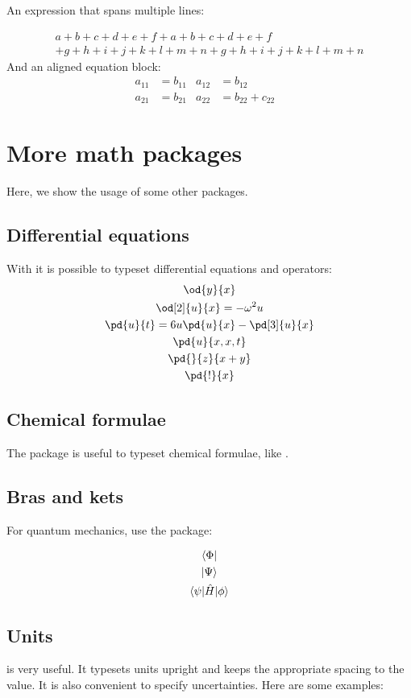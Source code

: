 An expression that spans multiple lines:

\begin{multline}
	a + b + c +d + e + f + a + b + c +d + e + f \\
	+ g + h + i + j + k + l + m + n+ g + h + i + j + k + l + m + n
\end{multline}
And an aligned equation block:
\begin{align}
	a_{11} & = b_{11}          &
	a_{12} & = b_{12}          & \\
	a_{21} & = b_{21}          &
	a_{22} & = b_{22} + c_{22}
\end{align}

\section{More math packages}
Here, we show the usage of some other packages.
\subsection{Differential equations}
With  it is possible to typeset differential equations and operators:
\begin{gather}
	\od{y}{x}\\
	\od[2]{u}{x} = -\omega^2 u\\
	\pd{u}{t} = 6u \pd{u}{x} - \pd[3]{u}{x}\\
	\pd{u}{x,x,t}\\
	\pd{}{z}{x+y}\\
	\pd{!}{x}
\end{gather}

\subsection{Chemical formulae}
The package  is useful to typeset chemical formulae, like .

\subsection{Bras and kets}
For quantum mechanics, use the  package:

\begin{gather}
	\bra{\Phi}\\
	\ket{\Psi}\\
	\braket{\psi|\hat{H}|\phi}
\end{gather}

\subsection{Units}
 is very useful. It typesets units upright and keeps the appropriate spacing to the value. It is also convenient to specify uncertainties. Here are some examples:

